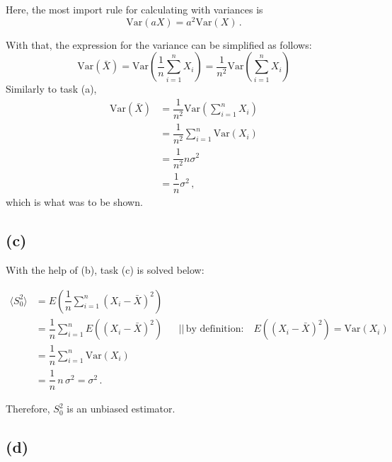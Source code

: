 Here, the most import rule for calculating with variances is
\begin{equation*}
    \text{Var}(aX) = a^2 \text{Var}(X) \,.
\end{equation*}

With that, the expression for the variance can be simplified as follows:
\begin{equation*}
    \text{Var}(\bar{X}) = \text{Var} \left(\dfrac{1}{n} \sum_{i=1}^n X_i \right) = \dfrac{1}{n^2} \text{Var} \left(\sum_{i=1}^n X_i \right)
\end{equation*}
Similarly to task (a),
\begin{align*}
    \text{Var}(\bar{X}) &= \dfrac{1}{n^2} \text{Var} \left(\sum_{i=1}^n X_i \right) \\
                        &= \dfrac{1}{n^2} \sum_{i=1}^n \text{Var}(X_i) \\
                        &= \dfrac{1}{n^2} n \sigma^2 \\
                        &= \dfrac{1}{n} \sigma^2 \,,
\end{align*}
which is what was to be shown.

\subsection*{(c)}

With the help of (b), task (c) is solved below:

\begin{align*}
    \langle S_0^2 \rangle &= E \left( \dfrac{1}{n} \sum_{i=1}^n (X_i - \bar{X})^2 \right) \\
                          &= \dfrac{1}{n} \sum_{i=1}^n E((X_i - \bar{X})^2) && \text{||} \, \text{by definition:} \quad E((X_i - \bar{X})^2) = \text{Var}(X_i) \\
                          &= \dfrac{1}{n} \sum_{i=1}^n \text{Var}(X_i) \\
                          &= \dfrac{1}{n} \, n \, \sigma^2 = \sigma^2 \,.
\end{align*}

Therefore, $S_0^2$ is an unbiased estimator.

\subsection*{(d)}

